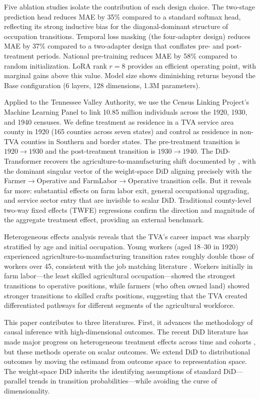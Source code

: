 \documentclass[12pt]{article}
\begin{document}
Five ablation studies isolate the contribution of each design choice. The two-stage prediction head reduces MAE by 35\% compared to a standard softmax head, reflecting its strong inductive bias for the diagonal-dominant structure of occupation transitions. Temporal loss masking (the four-adapter design) reduces MAE by 37\% compared to a two-adapter design that conflates pre- and post-treatment periods. National pre-training reduces MAE by 58\% compared to random initialization. LoRA rank $r = 8$ provides an efficient operating point, with marginal gains above this value. Model size shows diminishing returns beyond the Base configuration (6 layers, 128 dimensions, 1.3M parameters).

Applied to the Tennessee Valley Authority, we use the Census Linking Project's Machine Learning Panel \citep{price2021mlp, abramitzky2019automated} to link 10.85 million individuals across the 1920, 1930, and 1940 censuses. We define treatment as residence in a TVA service area county in 1920 (165 counties across seven states) and control as residence in non-TVA counties in Southern and border states. The pre-treatment transition is $1920 \to 1930$ and the post-treatment transition is $1930 \to 1940$. The DiD-Transformer recovers the agriculture-to-manufacturing shift documented by \citet{klineMoretti2014local}, with the dominant singular vector of the weight-space DiD aligning precisely with the Farmer$\to$Operative and FarmLabor$\to$Operative transition cells. But it reveals far more: substantial effects on farm labor exit, general occupational upgrading, and service sector entry that are invisible to scalar DiD. Traditional county-level two-way fixed effects (TWFE) regressions confirm the direction and magnitude of the aggregate treatment effect, providing an external benchmark.

Heterogeneous effects analysis reveals that the TVA's career impact was sharply stratified by age and initial occupation. Young workers (aged 18--30 in 1920) experienced agriculture-to-manufacturing transition rates roughly double those of workers over 45, consistent with the job matching literature \citep{jovanovic1979job, topel1991specific}. Workers initially in farm labor---the least skilled agricultural occupation---showed the strongest transitions to operative positions, while farmers (who often owned land) showed stronger transitions to skilled crafts positions, suggesting that the TVA created differentiated pathways for different segments of the agricultural workforce.

This paper contributes to three literatures. First, it advances the methodology of causal inference with high-dimensional outcomes. The recent DiD literature has made major progress on heterogeneous treatment effects across time and cohorts \citep{callaway2021difference, sunAbraham2021, deChaisemartin2020two, goodmanBacon2021difference, rambachanRoth2023, borusyak2024revisiting}, but these methods operate on scalar outcomes. We extend DiD to distributional outcomes by moving the estimand from outcome space to representation space. The weight-space DiD inherits the identifying assumptions of standard DiD---parallel trends in transition probabilities---while avoiding the curse of dimensionality.
\end{document}
